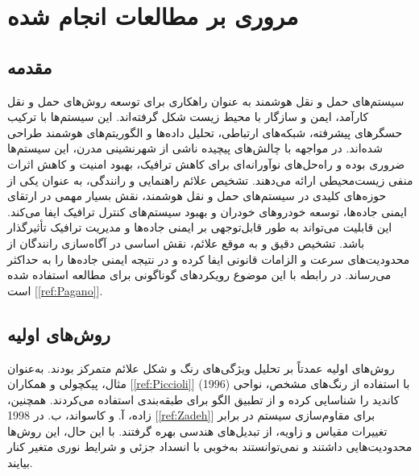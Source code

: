 



\chapter{مروری بر مطالعات انجام شده}
\section{مقدمه}

سیستم‌های حمل و نقل هوشمند  به عنوان راهکاری برای توسعه روش‌های حمل و نقل کارآمد، ایمن و سازگار با محیط زیست شکل گرفته‌اند. این سیستم‌ها با ترکیب حسگرهای پیشرفته، شبکه‌های ارتباطی، تحلیل داده‌ها و الگوریتم‌های هوشمند طراحی شده‌اند. در مواجهه با چالش‌های پیچیده ناشی از شهرنشینی مدرن، این سیستم‌ها ضروری بوده و راه‌حل‌های نوآورانه‌ای برای کاهش ترافیک، بهبود امنیت و کاهش اثرات منفی زیست‌محیطی ارائه می‌دهند. تشخیص علائم راهنمایی و رانندگی، به عنوان یکی از حوزه‌های کلیدی در سیستم‌های حمل و نقل هوشمند، نقش بسیار مهمی در ارتقای ایمنی جاده‌ها، توسعه خودروهای خودران و بهبود سیستم‌های کنترل ترافیک ایفا می‌کند. این قابلیت می‌تواند به طور قابل‌توجهی بر ایمنی جاده‌ها و مدیریت ترافیک تأثیرگذار باشد. تشخیص دقیق و به موقع علائم، نقش اساسی در آگاه‌سازی رانندگان از محدودیت‌های سرعت و الزامات قانونی ایفا کرده و در نتیجه ایمنی جاده‌ها را به حداکثر می‌رساند. در رابطه با این موضوع رویکردهای گوناگونی برای مطالعه استفاده شده است [\ref{ref:Pagano}].

\section{روش‌های اولیه}

روش‌های اولیه عمدتاً بر تحلیل ویژگی‌های رنگ و شکل علائم متمرکز بودند. به‌عنوان مثال، پیکچولی و همکاران [\ref{ref:Piccioli}] (1996) با استفاده از رنگ‌های مشخص، نواحی کاندید را شناسایی کرده و از تطبیق الگو برای طبقه‌بندی استفاده می‌کردند. همچنین، زاده، آ. و کاسواند، ب. در 1998 [\ref{ref:Zadeh}] برای مقاوم‌سازی سیستم در برابر تغییرات مقیاس و زاویه، از تبدیل‌های هندسی بهره گرفتند. با این حال، این روش‌ها محدودیت‌هایی داشتند و نمی‌توانستند به‌خوبی با انسداد جزئی و شرایط نوری متغیر کنار بیایند.

